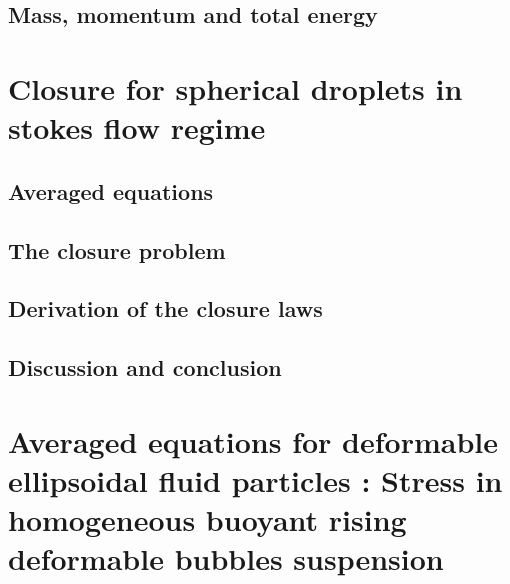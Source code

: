 \documentclass[12pt,a4paper,openany]{My_book}
\begin{document}
\section{Mass, momentum and total energy}
\label{ap:hypothesis}







\chapter{Closure for spherical droplets in stokes flow regime }
\section{Averaged equations}


\section{The closure problem}
\label{ap:Closure_problem}


\section{Derivation of the closure laws}
\label{sec:application}


\section{Discussion and conclusion}


\chapter{Averaged equations for deformable ellipsoidal fluid particles : Stress in homogeneous buoyant rising deformable bubbles suspension }
\localtableofcontents


\end{document}
